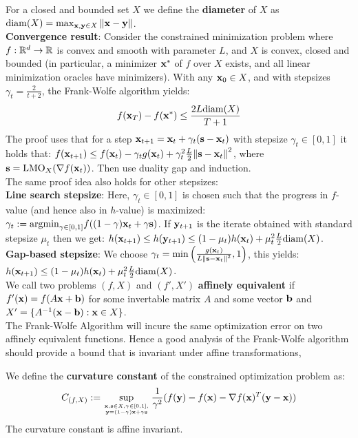 For a closed and bounded set $X$ we define the \textbf{diameter} of $X$ as $\mathrm{diam}(X) = \max_{\mathbf{x}, \mathbf{y} \in X}{\norm{\mathbf{x} -\mathbf{y}}}$. \\
\textbf{Convergence result}: Consider the constrained minimization problem where $f : \mathbb{R}^d \rightarrow \mathbb{R}$ is convex and smooth with parameter $L$, and $X$ is convex, closed and bounded (in particular, a minimizer $\mathbf{x}^*$ of $f$ over $X$ exists, and all linear minimization oracles have minimizers). With any $\mathbf{x}_0 \in X$, and with stepsizes $\gamma_t = \frac{2}{t+2}$, the Frank-Wolfe algorithm yields:
\begin{align*}
    f(\mathbf{x}_T) - f(\mathbf{x}^*) \leq \frac{2L \mathrm{diam}(X)}{T+1}
\end{align*}
The proof uses that for a step $\mathbf{x}_{t+1} = \mathbf{x}_t + \gamma_t(\mathbf{s} - \mathbf{x}_t)$ with stepsize $\gamma_t \in [0, 1]$ it holds that: $f(\mathbf{x}_{t+1}) \leq f(\mathbf{x}_t) - \gamma_t g(\mathbf{x}_t) + \gamma_t^2 \frac{L}{2}\norm{\mathbf{s} - \mathbf{x}_t}^2$, where $\mathbf{s} = \mathrm{LMO}_X(\nabla f(\mathbf{x}_t))$. Then use duality gap and induction. \\
The same proof idea also holds for other stepsizes: \\
\textbf{Line search stepsize}: Here, $\gamma_t \in [0, 1]$ is chosen such that the progress in $f$-value (and hence also in $h$-value) is maximized: $\gamma_t := \mathrm{argmin}_{\gamma \in [0, 1]}{f((1-\gamma) \mathbf{x}_t + \gamma \mathbf{s})}$. If $\mathbf{y}_{t+1}$ is the iterate obtained with standard stepsize $\mu_t$ then we get: $h(\mathbf{x}_{t+1}) \leq h(\mathbf{y}_{t+1}) \leq (1 - \mu_t)h(\mathbf{x}_t) + \mu_t^2 \frac{L}{2} \mathrm{diam}(X)$. \\
\textbf{Gap-based stepsize}: We choose $\gamma_t = \min \left( \frac{g(\mathbf{x}_t)}{L\norm{\mathbf{s} - \mathbf{x}_t}^2}, 1\right)$, this yields: $h(\mathbf{x}_{t+1}) \leq (1 - \mu_t) h(\mathbf{x}_t) + \mu_t^2 \frac{L}{2}\mathrm{diam}(X)$. \\
We call two problems $(f, X)$ and $(f', X')$ \textbf{affinely equivalent} if $f'(\mathbf{x}) = f(A\mathbf{x} + \mathbf{b})$ for some invertable matrix $A$ and some vector $\mathbf{b}$ and $X' = \{A^{-1}(\mathbf{x} - \mathbf{b}): \mathbf{x} \in X\}$. \\
The Frank-Wolfe Algorithm will incure the same optimization error on two affinely equivalent functions. Hence a good analysis of the Frank-Wolfe algorithm should provide a bound that is invariant under affine transformations, \\
\begin{framed}
    We define the \textbf{curvature constant} of the constrained optimization problem as:
    \begin{align*}
        C_{(f, X)} := \sup_{\mathbf{x}, \mathbf{s} \in X, \gamma \in [0, 1], \atop \mathbf{y} = (1-\gamma)\mathbf{x} + \gamma \mathbf{s}}{\frac{1}{\gamma^2}(f(\mathbf{y}) - f(\mathbf{x}) - \nabla f(\mathbf{x})^T (\mathbf{y} - \mathbf{x}))}
    \end{align*}
    The curvature constant is affine invariant.
\end{framed}
